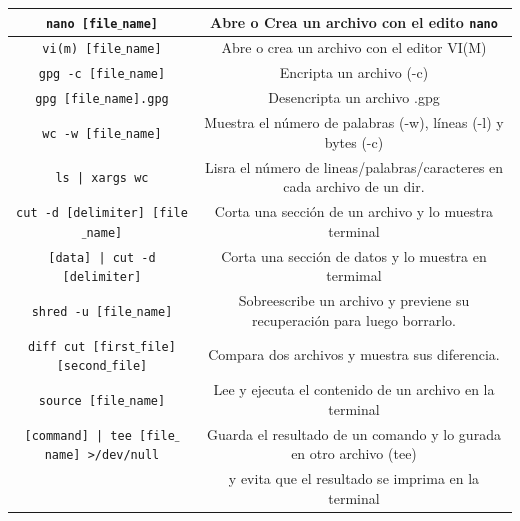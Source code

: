 \documentclass[a4paper,10pt]{article}
\begin{document}
\begin{center}
\begin{tabular}{| c | c |}
        \hline
        \texttt{nano [file$\_$name]} & Abre o Crea un archivo con el edito \texttt{nano} \\
        \hline
        \texttt{vi(m) [file$\_$name]} & Abre o crea un archivo con el editor VI(M) \\
        \hline
        \texttt{gpg -c [file$\_$name]} & Encripta un archivo (-c) \\
        \hline
        \texttt{gpg [file$\_$name].gpg} & Desencripta un archivo .gpg \\
        \hline
        \texttt{wc -w [file$\_$name]} & Muestra el número de palabras (-w), líneas (-l) y bytes (-c) \\
        \hline
        \texttt{ls | xargs wc} & Lisra el número de lineas/palabras/caracteres en cada archivo de un dir. \\
        \hline
        \texttt{cut -d [delimiter] [file$\_$name]} & Corta una sección de un archivo y lo muestra terminal \\
        \hline
        \texttt{[data] | cut -d [delimiter]} & Corta una sección de datos y lo muestra en termimal \\
        \hline
        \texttt{shred -u [file$\_$name]} & Sobreescribe un archivo y previene su recuperación para luego borrarlo. \\
        \hline
        \texttt{diff cut [first$\_$file] [second$\_$file]} & Compara dos archivos y muestra sus diferencia. \\
        \hline
        \texttt{source [file$\_$name]} & Lee y ejecuta el contenido de un archivo en la terminal \\
        \hline
        \texttt{[command] | tee [file$\_$name] >/dev/null} & Guarda el resultado de un comando y lo gurada en otro archivo (tee) \\
        &  y evita que el resultado se imprima en la terminal \\
        \hline

    \end{tabular}
\end{center}
\end{document}
